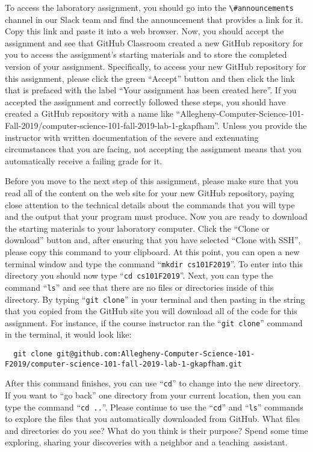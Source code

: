 \documentclass[11pt]{article}
\newcommand{\command}[1]{``\lstinline{#1}''}
\newcommand{\channel}[1]{\lstinline{#1}}
\newcommand{\step}[1]{``{#1}''}
\begin{document}
To access the laboratory assignment, you should go into the
\channel{\#announcements} channel in our Slack team and find the announcement
that provides a link for it. Copy this link and paste it into a web browser.
Now, you should accept the assignment and see that GitHub Classroom created a
new GitHub repository for you to access the assignment's starting materials and
to store the completed version of your assignment. Specifically, to access your
new GitHub repository for this assignment, please click the green ``Accept''
button and then click the link that is prefaced with the label ``Your assignment
has been created here''. If you accepted the assignment and correctly followed
these steps, you should have created a GitHub repository with a name like
``Allegheny-Computer-Science-101-Fall-2019/computer-science-101-fall-2019-lab-1-gkapfham''.
Unless you provide the instructor with written documentation of the severe and
extenuating circumstances that you are facing, not accepting the assignment
means that you automatically receive a failing grade for it.

Before you move to the next step of this assignment, please make sure that you
read all of the content on the web site for your new GitHub repository, paying
close attention to the technical details about the commands that you will type
and the output that your program must produce. Now you are ready to download the
starting materials to your laboratory computer. Click the ``Clone or download''
button and, after ensuring that you have selected ``Clone with SSH'', please
copy this command to your clipboard. At this point, you can open a new terminal
window and type the command \command{mkdir cs101F2019}. To enter into this
directory you should now type \command{cd cs101F2019}. Next, you can type the
command \command{ls} and see that there are no files or directories inside of
this directory. By typing \command{git clone} in your terminal and then pasting
in the string that you copied from the GitHub site you will download all of the
code for this assignment. For instance, if the course instructor ran the
\command{git clone} command in the terminal, it would look like:

\begin{lstlisting}
  git clone git@github.com:Allegheny-Computer-Science-101-F2019/computer-science-101-fall-2019-lab-1-gkapfham.git
\end{lstlisting}

After this command finishes, you can use \command{cd} to change into the new
directory. If you want to \step{go back} one directory from your current
location, then you can type the command \command{cd ..}. Please continue to use
the \command{cd} and \command{ls} commands to explore the files that you
automatically downloaded from GitHub. What files and directories do you see?
What do you think is their purpose? Spend some time exploring, sharing your
discoveries with a neighbor and a \mbox{teaching assistant}.
\end{document}
